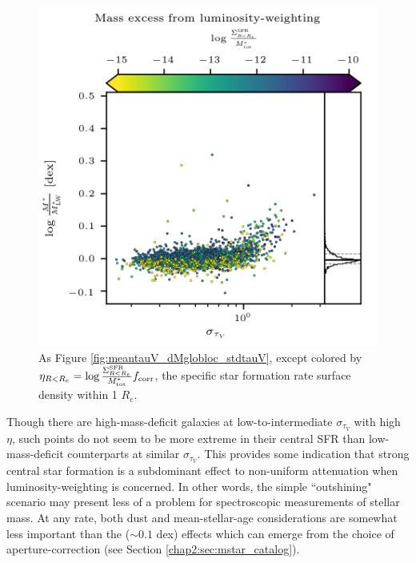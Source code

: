 \begin{figure}
    \centering
    \includegraphics[width=\columnwidth]{stdtauV_dMglobloc_ssfrsd}
    \caption[The relationship between star-formation rate and stacking-induced mass deficit]{\fixspacing As Figure \ref{fig:meantauV_dMglobloc_stdtauV}, except colored by $\eta_{R<R_e} = \log \frac{\Sigma^{\rm SFR}_{R<R_e}}{M^*_{\rm tot}} f_{\rm corr}$, the specific star formation rate surface density within 1 $R_e$.}
    \label{fig:stdtauV_dMglobloc_ssfrsd}
\end{figure}

Though there are high-mass-deficit galaxies at low-to-intermediate $\sigma_{\tau_V}$ with high $\eta$, such points do not seem to be more extreme in their central SFR than low-mass-deficit counterparts at similar $\sigma_{\tau_V}$. This provides some indication that strong central star formation is a subdominant effect to non-uniform attenuation when luminosity-weighting is concerned. In other words, the simple ``outshining" scenario may present less of a problem for spectroscopic measurements of stellar mass. At any rate, both dust and mean-stellar-age considerations are somewhat less important than the ($\sim 0.1$ dex) effects which can emerge from the choice of aperture-correction (see Section \ref{chap2:sec:mstar_catalog}). 

